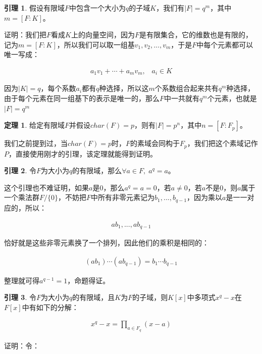 \documentclass[12pt, a4paper, oneside]{ctexart}
\theoremstyle{definition}
\newtheorem*{theorem}{定理}
\newtheorem*{lemma}{引理}
\begin{document}
\begin{lemma}
假设有限域$F$中包含一个大小为$q$的子域$K$，我们有$|F|=q^m$，其中$m=[F:K]$。
\end{lemma}

证明：我们把$F$看成$K$上的向量空间，因为$F$是有限集合，它的维数也是有限的，记为$m=[F:K]$，所以我们可以取一组基$v_1,v_2,...,v_m$，于是$F$中每个元素都可以唯一写成：

\begin{align*}
a_1v_1+\cdots+a_mv_m,\;\;\; a_i\in K
\end{align*}

因为$|K|=q$，每个系数$a_i$都有$q$种选择，所以这$m$个系数组合起来共有$q^m$种选择，由于每个元素在同一组基下的表示是唯一的，那么$F$中一共就有$q^m$个元素，也就是$|F|=q^m$

\begin{theorem}
给定有限域$F$并假设$char(F)=p$，则有$|F|=p^n$，其中$n=[F:F_p]$。
\end{theorem}

我们之前提到过，当$char(F)=p$时，$F$的素域会同构于$F_p$，我们把这个素域记作$P$，直接使用刚才的引理，该定理就能得到证明。

\begin{lemma}
令$F$为大小为$q$的有限域，那么$\forall a\in F,\; a^q=a$。
\end{lemma}

这个引理也不难证明，如果$a$是0，那么$a^q=a=0$，若$a\neq 0$，若$a$不是0，则$a$属于一个乘法群$F/\{0\}$，不妨把$F$中所有非零元素记为$b_1,...,b_{q-1}$，因为乘以$a$是一一对应的，所以：

\begin{align*}
ab_1,...,ab_{q-1}
\end{align*}

恰好就是这些非零元素换了一个排列，因此他们的乘积是相同的：

\begin{align*}
(ab_1)\cdots(ab_{q-1})=b_1\cdots b_{q-1}
\end{align*}

整理就可得$a^{q-1}=1$，命题得证。

\begin{lemma}
令$F$为大小为$q$的有限域，且$K$为$F$的子域，则$K[x]$中多项式$x^q-x$在$F[x]$中有如下的分解：

\begin{align*}
x^q-x=\prod_{a\in F_q}(x-a)
\end{align*}
\end{lemma}

证明：令：
\end{document}
